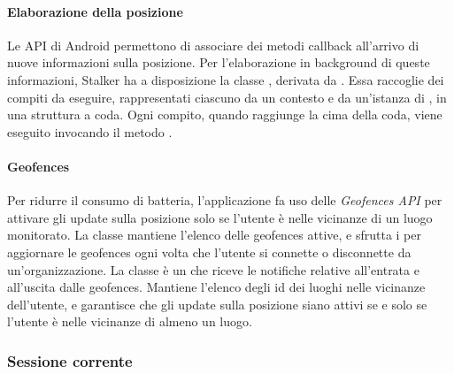 \documentclass[../../manuale-manutentore.tex]{subfiles}
\begin{document}
\paragraph{Elaborazione della posizione}%
\label{par:elaborazione_della_posizione}

Le API di Android permettono di associare dei metodi callback all'arrivo di nuove informazioni sulla posizione.
Per l'elaborazione in background di queste informazioni, Stalker ha a disposizione la classe \linebreak{}, derivata da .
Essa raccoglie dei compiti da eseguire, rappresentati ciascuno da un contesto e da un'istanza di , in una struttura a coda.
Ogni compito, quando raggiunge la cima della coda, viene eseguito invocando il metodo \linebreak{}.

\paragraph{Geofences}%
\label{par:geofences}

Per ridurre il consumo di batteria, l'applicazione fa uso delle \textit{Geofences API} per attivare gli update sulla posizione solo se l'utente è nelle vicinanze di un luogo monitorato.
La classe  mantiene l'elenco delle geofences attive, e sfrutta i  per aggiornare le geofences ogni volta che l'utente si connette o disconnette da un'organizzazione.
La classe  è un  che riceve le notifiche relative all'entrata e all'uscita dalle geofences.
Mantiene l'elenco degli id dei luoghi nelle vicinanze dell'utente, e garantisce che gli update sulla posizione siano attivi se e solo se l'utente è nelle vicinanze di almeno un luogo.

\subsubsection{Sessione corrente}%
\label{subs:sessione_corrente}
\end{document}
